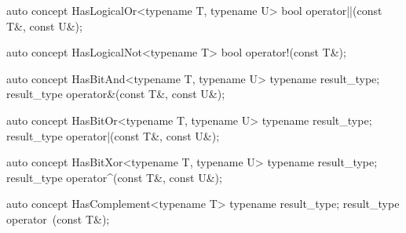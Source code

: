 \documentclass[american,twoside]{book}
\begin{document}
\begin{itemdecl}
auto concept HasLogicalOr<typename T, typename U> {
  bool operator||(const T&, const U&);
}
\end{itemdecl}

\begin{itemdescr}
\pnum
{}
\end{itemdescr}

\begin{itemdecl}
auto concept HasLogicalNot<typename T> {
  bool operator!(const T&);
}
\end{itemdecl}

\begin{itemdescr}
\pnum
{}
\end{itemdescr}

\begin{itemdecl}
auto concept HasBitAnd<typename T, typename U> {
  typename result_type;
  result_type operator&(const T&, const U&);
}
\end{itemdecl}

\begin{itemdescr}
\pnum
{}
\end{itemdescr}

\begin{itemdecl}
auto concept HasBitOr<typename T, typename U> {
  typename result_type;
  result_type operator|(const T&, const U&);
}
\end{itemdecl}

\begin{itemdescr}
\pnum
{}
\end{itemdescr}

\begin{itemdecl}
auto concept HasBitXor<typename T, typename U> {
  typename result_type;
  result_type operator^(const T&, const U&);
}
\end{itemdecl}

\begin{itemdescr}
\pnum
{}
\end{itemdescr}

\begin{itemdecl}
auto concept HasComplement<typename T> {
  typename result_type;
  result_type operator~(const T&);
}
\end{itemdecl}
\end{document}
